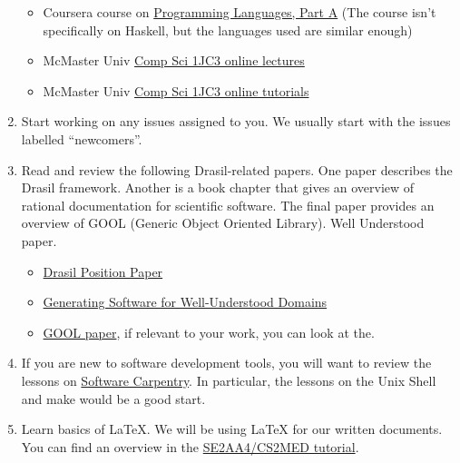 \documentclass[12pt]{article}
\begin{document}
\begin{enumerate}
\begin{itemize}
\item Coursera course on
\href{https://www.coursera.org/learn/programming-languages} {Programming
Languages, Part A} (The course isn't specifically on Haskell, but the languages
used are similar enough)

\item McMaster Univ
\href{https://www.youtube.com/watch?v=eGwR_MiIT_A&list=PLknslYp7IpnJYHyJd02cOsp0ZBKxWBXK9}
{Comp Sci 1JC3 online lectures} 

\item McMaster Univ
\href{https://www.youtube.com/watch?v=7WxbuAztuFs&list=PLHRF-X-NtQR4MZBvm05NshPIEI8ELID5m}
{Comp Sci 1JC3 online tutorials} 

\end{itemize}

\item Start working on any issues assigned to you.  We usually start with the
issues labelled ``newcomers''.

\item Read and review the following Drasil-related papers.  One paper describes
the Drasil framework.  Another is a book chapter that gives an overview of
rational documentation for scientific software.  The final paper provides an
overview of GOOL (Generic Object Oriented Library).  Well Understood paper.

\begin{itemize}

\item
\href{https://gitlab.cas.mcmaster.ca/smiths/pub/-/blob/master/SzymczakEtAl2016.pdf}
{Drasil Position Paper} 

\item \href{https://arxiv.org/abs/2302.00740} {Generating Software for
Well-Understood Domains}

\item \href{https://arxiv.org/abs/1911.11824} {GOOL paper}, if relevant to
your work, you can look at the.

\end{itemize}

\item If you are new to software development tools, you will want to review the
lessons on \href{http://software-carpentry.org/lessons/} {Software Carpentry}.
In particular, the lessons on the Unix Shell and make would be a good start.

\item Learn basics of LaTeX.  We will be using LaTeX for our written documents.
You can find an overview in the
\href{https://gitlab.cas.mcmaster.ca/smiths/se2aa4_cs2me3/-/tree/master/Tutorials\%2FT02a-LaTeX}
{SE2AA4/CS2MED tutorial}.

\end{enumerate}
\end{document}
